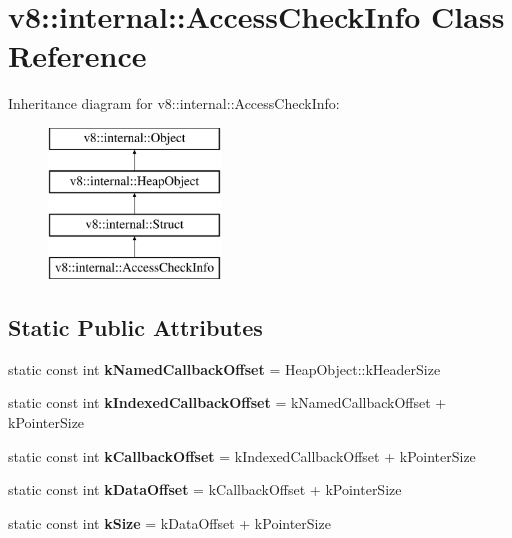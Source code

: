 \hypertarget{classv8_1_1internal_1_1_access_check_info}{}\section{v8\+:\+:internal\+:\+:Access\+Check\+Info Class Reference}
\label{classv8_1_1internal_1_1_access_check_info}
Inheritance diagram for v8\+:\+:internal\+:\+:Access\+Check\+Info\+:\begin{figure}[H]
\begin{center}
\leavevmode
\includegraphics[height=4.000000cm]{classv8_1_1internal_1_1_access_check_info}
\end{center}
\end{figure}
\subsection*{Static Public Attributes}
\begin{DoxyCompactItemize}
\item 
static const int {\bfseries k\+Named\+Callback\+Offset} = Heap\+Object\+::k\+Header\+Size\hypertarget{classv8_1_1internal_1_1_access_check_info_a6cbd64c953819b14e3944340ad05e048}{}\label{classv8_1_1internal_1_1_access_check_info_a6cbd64c953819b14e3944340ad05e048}

\item 
static const int {\bfseries k\+Indexed\+Callback\+Offset} = k\+Named\+Callback\+Offset + k\+Pointer\+Size\hypertarget{classv8_1_1internal_1_1_access_check_info_a5bcd567490f425a95da4a3dae4e73e11}{}\label{classv8_1_1internal_1_1_access_check_info_a5bcd567490f425a95da4a3dae4e73e11}

\item 
static const int {\bfseries k\+Callback\+Offset} = k\+Indexed\+Callback\+Offset + k\+Pointer\+Size\hypertarget{classv8_1_1internal_1_1_access_check_info_ad7efe45a5c6352736d2a37edcebc9eda}{}\label{classv8_1_1internal_1_1_access_check_info_ad7efe45a5c6352736d2a37edcebc9eda}

\item 
static const int {\bfseries k\+Data\+Offset} = k\+Callback\+Offset + k\+Pointer\+Size\hypertarget{classv8_1_1internal_1_1_access_check_info_a1739da947958ae7735ac674e2aac415b}{}\label{classv8_1_1internal_1_1_access_check_info_a1739da947958ae7735ac674e2aac415b}

\item 
static const int {\bfseries k\+Size} = k\+Data\+Offset + k\+Pointer\+Size\hypertarget{classv8_1_1internal_1_1_access_check_info_a30e7585ebfa4c24c214bc5a9f77ad0c3}{}\label{classv8_1_1internal_1_1_access_check_info_a30e7585ebfa4c24c214bc5a9f77ad0c3}

\end{DoxyCompactItemize}
